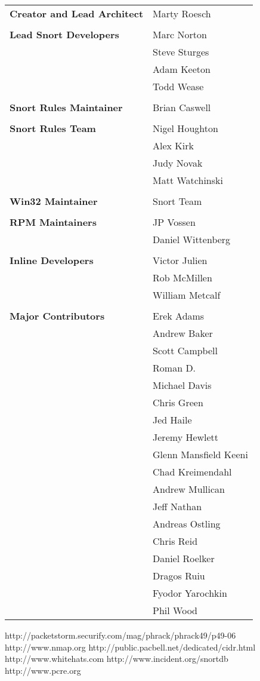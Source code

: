 \documentclass[english]{report}
\begin{document}
\begin{tabular}{p{3in} p{3in}}

\textbf{Creator and Lead Architect} &	 Marty Roesch\\
\\
\textbf{Lead Snort Developers} &	 Marc Norton\\
 & 					 Steve Sturges\\
 & 					 Adam Keeton\\
 & 					 Todd Wease\\
\\
\textbf{Snort Rules Maintainer} & 	 Brian Caswell\\
\\
\textbf{Snort Rules Team} &		 Nigel Houghton\\
 		& 			Alex Kirk\\
		&			Judy Novak\\
		&			Matt Watchinski\\
\\
\textbf{Win32 Maintainer} &	 	Snort Team\\
\\
\textbf{RPM Maintainers} &	 	JP Vossen\\
			&		Daniel Wittenberg\\
\\
\textbf{Inline Developers} &	 	Victor Julien\\
				&	Rob McMillen\\
				& 	William Metcalf\\
\\
\textbf{Major Contributors} &		Erek Adams\\
		&		Andrew Baker\\
		&		Scott Campbell\\
		&		Roman D.\\
		&		Michael Davis\\
		&		Chris Green\\
		&		Jed Haile\\
        &	 Jeremy Hewlett\\
		&		Glenn Mansfield Keeni\\
		&		Chad Kreimendahl\\
        & 		Andrew Mullican\\
		&		Jeff Nathan\\
		&		Andreas Ostling\\
        &	 	Chris Reid\\
        & 	    Daniel Roelker\\
		&		Dragos Ruiu\\
		&		Fyodor Yarochkin\\
		&		Phil Wood
\end{tabular}
\appendix

\begin{thebibliography}{99}
http://packetstorm.securify.com/mag/phrack/phrack49/p49-06
http://www.nmap.org
http://public.pacbell.net/dedicated/cidr.html
http://www.whitehats.com
http://www.incident.org/snortdb
http://www.pcre.org
\end{thebibliography}
\end{document}

